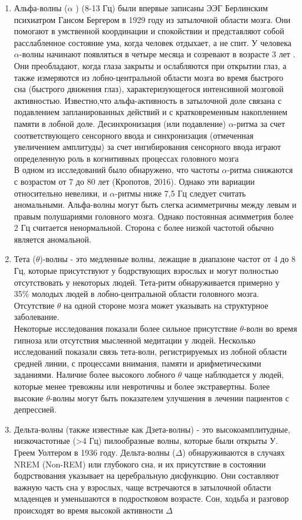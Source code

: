 \documentclass[12pt, a4paper, titlepage]{extreport}
\begin{document}
\begin{enumerate}
		\item Альфа-волны ($\alpha$ ) (8-13 Гц) были впервые записаны ЭЭГ Берлинским психиатром Гансом Бергером в 1929 году из затылочной области мозга. Они помогают в умственной координации и спокойствии и представляют собой расслабленное состояние ума, когда человек отдыхает, а не спит. У человека $\alpha$-волны начинают появляться в четыре месяца и созревают в возрасте 3 лет \cite{42}. Они преобладают, когда глаза закрыты и ослабляются при открытии глаз, а также измеряются из лобно-центральной области мозга во время быстрого сна (быстрого движения глаз), характеризующегося интенсивной мозговой активностью. Известно,что альфа-активность в затылочной доле связана с подавлением запланированных действий и с кратковременным накоплением памяти в лобной доле. Десинхронизация (или подавление) $\alpha$-ритма за счет соответствующего сенсорного ввода и синхронизация (отмеченная увеличением амплитуды) за счет ингибирования сенсорного ввода играют определенную роль в когнитивных процессах головного мозга \\
		В одном из исследований было обнаружено, что частоты $\alpha$-ритма снижаются с возрастом от 7 до 80 лет (Кропотов, 2016). Однако эти вариации относительно невелики, и $\alpha$-ритмы ниже 7,5 Гц следует считать аномальными. Альфа-волны могут быть слегка асимметричны между левым и правым полушариями головного мозга. Однако постоянная асимметрия более 2 Гц считается ненормальной. Сторона с более низкой частотой обычно является аномальной.
		
		\item Тета ($\theta$)-волны - это медленные волны, лежащие в диапазоне частот от 4 до 8 Гц, которые присутствуют у бодрствующих взрослых и могут полностью отсутствовать у некоторых людей. Тета-ритм обнаруживается примерно у 35\% молодых людей в лобно-центральной области головного мозга. Отсутствие $\theta$ на одной стороне мозга может указывать на структурное заболевание. \\
		Некоторые исследования показали более сильное присутствие $\theta$-волн во время гипноза или отсутствия мысленной медитации у людей. Несколько исследований показали связь тета-волн, регистрируемых из лобной области средней линии, с процессами внимания, памяти и арифметическими заданиями. Наличие более высокого лобного $\theta$ чаще наблюдается у людей, которые менее тревожны или невротичны и более экстравертны. Более высокие $\theta$-волны могут быть показателем улучшения в лечении пациентов с депрессией.
		
		\item Дельта-волны (также известные как Дзета-волны) - это высокоамплитудные, низкочастотные (>4 Гц) пилообразные волны, которые были открыты У. Греем Уолтером в 1936 году. Дельта-волны ($\Delta$) обнаруживаются в случаях NREM (Non-REM) или глубокого сна, и их присутствие в состоянии бодрствования указывает на церебральную дисфункцию. Они составляют важную часть сна у взрослых, чаще встречаются в затылочной области младенцев и уменьшаются в подростковом возрасте. Сон, ходьба и разговор происходят во время высокой активности $\Delta$
	\end{enumerate}
\end{document}

